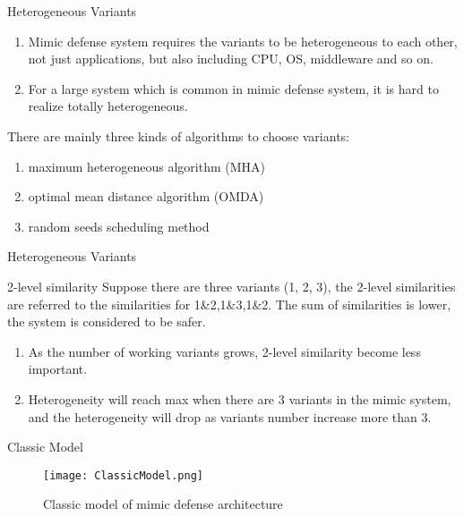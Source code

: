 \documentclass{beamer}
\begin{document}
\begin{frame}{Heterogeneous Variants}
    \begin{block}{}
        \begin{enumerate}
            \item Mimic defense system requires the variants to be heterogeneous to each other, not just applications, but also including CPU, OS, middleware and so on.
            \item For a large system which is common in mimic defense system, it is hard to realize totally heterogeneous. 
        \end{enumerate}
    \end{block}
    There are mainly three kinds of algorithms to choose variants: 
    \begin{block}{}
        \begin{enumerate}
            \item maximum heterogeneous algorithm (MHA)
            \item optimal mean distance algorithm (OMDA) 
            \item random seeds scheduling method 
        \end{enumerate}
    \end{block}
\end{frame}
\begin{frame}{Heterogeneous Variants}
    \begin{block}{2-level similarity}
    Suppose there are three variants (1, 2, 3), the 2-level similarities are referred to the similarities for 1\&2,1\&3,1\&2. The sum of similarities is lower, the system is considered to be safer.
    \end{block}
    \begin{block}{}
        \begin{enumerate}
            \item As the number of working variants grows, 2-level similarity become less important. 
            \item Heterogeneity will reach max when there are 3 variants in the mimic system, and the heterogeneity will drop as variants number increase more than 3.
        \end{enumerate}
    \end{block}
\end{frame}
\begin{frame}{Classic Model}
    \begin{figure}[!]
        \centering
        \texttt{[image: ClassicModel.png]}
        \caption{Classic model of mimic defense architecture}
    \end{figure}
\end{frame}
\end{document}
